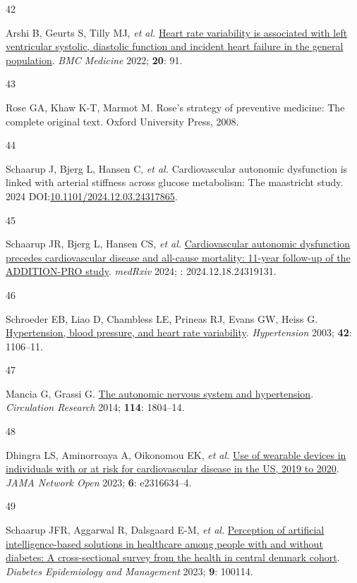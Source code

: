 \documentclass[
  a4paper,
  headsepline=true,
  open=any]{scrbook}
\newlength{\cslhangindent}
\newlength{\csllabelwidth}
\newlength{\cslentryspacingunit} %
\newenvironment{CSLReferences}[2] %
 {%
  \setlength{\parindent}{0pt}
  \ifodd #1
  \let\oldpar\par
  \def\par{\hangindent=\cslhangindent\oldpar}
  \fi
  \setlength{\parskip}{#2\cslentryspacingunit}
 }%
 {}
\newcommand{\CSLLeftMargin}[1]{\parbox[t]{\csllabelwidth}{#1}}
\newcommand{\CSLRightInline}[1]{\parbox[t]{\linewidth - \csllabelwidth}{#1}\break}
\begin{document}
\begin{CSLReferences}{0}{0}
\leavevmode{}%
\CSLLeftMargin{42 }%
\CSLRightInline{Arshi B, Geurts S, Tilly MJ, \emph{et al.}
\href{https://doi.org/10.1186/s12916-022-02273-9}{Heart rate variability
is associated with left ventricular systolic, diastolic function and
incident heart failure in the general population}. \emph{BMC Medicine}
2022; \textbf{20}: 91.}

\leavevmode{}%
\CSLLeftMargin{43 }%
\CSLRightInline{Rose GA, Khaw K-T, Marmot M. Rose's strategy of
preventive medicine: The complete original text. Oxford University
Press, 2008.}

\leavevmode{}%
\CSLLeftMargin{44 }%
\CSLRightInline{Schaarup J, Bjerg L, Hansen C, \emph{et al.}
Cardiovascular autonomic dysfunction is linked with arterial stiffness
across glucose metabolism: The maastricht study. 2024
DOI:\href{https://doi.org/10.1101/2024.12.03.24317865}{10.1101/2024.12.03.24317865}.}

\leavevmode{}%
\CSLLeftMargin{45 }%
\CSLRightInline{Schaarup JR, Bjerg L, Hansen CS, \emph{et al.}
\href{https://doi.org/10.1101/2024.12.18.24319131}{Cardiovascular
autonomic dysfunction precedes cardiovascular disease and all-cause
mortality: 11-year follow-up of the ADDITION-PRO study}. \emph{medRxiv}
2024; : 2024.12.18.24319131.}

\leavevmode{}%
\CSLLeftMargin{46 }%
\CSLRightInline{Schroeder EB, Liao D, Chambless LE, Prineas RJ, Evans
GW, Heiss G.
\href{https://doi.org/doi:10.1161/01.HYP.0000100444.71069.73}{Hypertension,
blood pressure, and heart rate variability}. \emph{Hypertension} 2003;
\textbf{42}: 1106--11.}

\leavevmode{}%
\CSLLeftMargin{47 }%
\CSLRightInline{Mancia G, Grassi G.
\href{https://doi.org/10.1161/CIRCRESAHA.114.302524}{The autonomic
nervous system and hypertension}. \emph{Circulation Research} 2014;
\textbf{114}: 1804--14.}

\leavevmode{}%
\CSLLeftMargin{48 }%
\CSLRightInline{Dhingra LS, Aminorroaya A, Oikonomou EK, \emph{et al.}
\href{https://doi.org/10.1001/jamanetworkopen.2023.16634}{Use of
wearable devices in individuals with or at risk for cardiovascular
disease in the US, 2019 to 2020}. \emph{JAMA Network Open} 2023;
\textbf{6}: e2316634--4.}

\leavevmode{}%
\CSLLeftMargin{49 }%
\CSLRightInline{Schaarup JFR, Aggarwal R, Dalsgaard E-M, \emph{et al.}
\href{https://doi.org/10.1016/j.deman.2022.100114}{Perception of
artificial intelligence-based solutions in healthcare among people with
and without diabetes: A cross-sectional survey from the health in
central denmark cohort}. \emph{Diabetes Epidemiology and Management}
2023; \textbf{9}: 100114.}


\end{CSLReferences}
\end{document}
